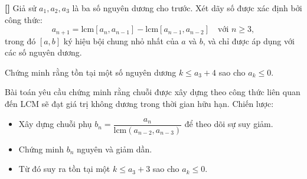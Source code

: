 \documentclass[../01-divisibility.tex]{subfiles}
\begin{document}
\begin{example*}\label{example:IRN-2015-TST-D3-P2}\textbf{[]}
	Giả sử \( a_1, a_2, a_3 \) là ba số nguyên dương cho trước. Xét dãy số được xác định bởi công thức:
	\[
		a_{n+1} = \text{lcm}[a_n, a_{n-1}] - \text{lcm}[a_{n-1}, a_{n-2}] \quad \text{với } n \geq 3,
	\]
	trong đó \( [a, b] \) ký hiệu bội chung nhỏ nhất của \( a \) và \( b \), và chỉ được áp dụng với các số nguyên dương.

	Chứng minh rằng tồn tại một số nguyên dương \( k \leq a_3 + 4 \) sao cho \( a_k \leq 0 \).
\end{example*}

\begin{story*}
	Bài toán yêu cầu chứng minh rằng chuỗi được xây dựng theo công thức liên quan đến LCM sẽ đạt giá trị không dương trong thời gian hữu hạn.
	Chiến lược:
	\begin{itemize}[topsep=0pt, itemsep=0pt]
		\item Xây dựng chuỗi phụ \( b_n = \dfrac{a_n}{\text{lcm}(a_{n-2}, a_{n-3})} \) để theo dõi sự suy giảm.
		\item Chứng minh \( b_n \) nguyên và giảm dần.
		\item Từ đó suy ra tồn tại một \( k \leq a_3 + 3 \) sao cho \( a_k \leq 0 \).
	\end{itemize}
\end{story*}
\end{document}

